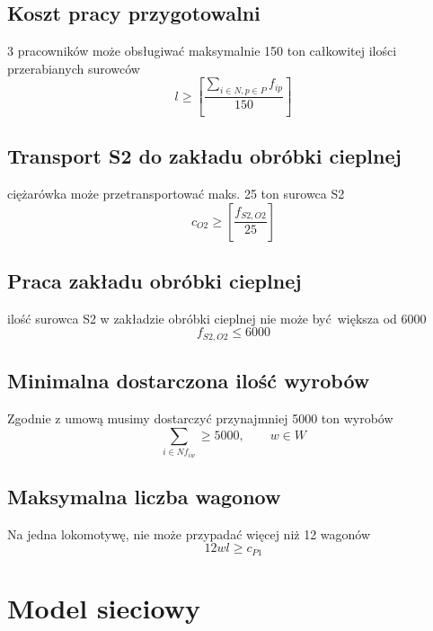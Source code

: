 \documentclass[12pt]{article}
\begin{document}
\subsection{Koszt pracy przygotowalni}
3 pracowników może obsługiwać maksymalnie 150 ton całkowitej ilości przerabianych surowców
\begin{equation}
l \geq [ \frac{ \sum_{i\in N, p \in P} f_{ip} }{150} ]
\end{equation}
\subsection{Transport S2 do zakładu obróbki cieplnej}
ciężarówka może przetransportować maks. 25 ton surowca S2
\begin{equation}
c_{O2} \geq [\frac{ f_{S2, O2} }{25}]
\end{equation}
\subsection{Praca zakładu obróbki cieplnej}
ilość surowca S2 w zakładzie obróbki cieplnej nie może być większa od 6000
\begin{equation}
f_{S2, O2} \leq 6000
\end{equation}
\subsection{Minimalna dostarczona ilość wyrobów}
Zgodnie z umową musimy dostarczyć przynajmniej 5000 ton wyrobów
\begin{equation}
\sum_{i \in N f_{iw}} \geq 5000, \qquad w \in W
\end{equation}
\subsection{Maksymalna liczba wagonow}
Na jedna lokomotywę, nie może przypadać więcej niż 12 wagonów
\begin{equation}
12wl \geq c_{P1}
\end{equation}

\section{Model sieciowy}

\end{document}
